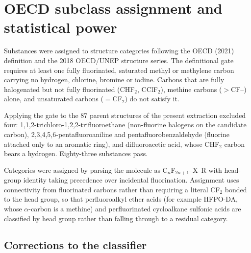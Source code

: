\documentclass[11pt]{article}
\begin{document}
\section{OECD subclass assignment and statistical power}

Substances were assigned to structure categories following the OECD (2021)
definition and the 2018 OECD/UNEP structure series. The definitional gate
requires at least one fully fluorinated, saturated methyl or methylene carbon
carrying no hydrogen, chlorine, bromine or iodine. Carbons that are fully
halogenated but not fully fluorinated (CHF$_2$, CClF$_2$), methine carbons
($>$CF--) alone, and unsaturated carbons ($=$CF$_2$) do not satisfy it.

Applying the gate to the 87 parent structures of the present extraction excluded
four: 1,1,2-tri\-chloro-1,2,2-tri\-fluoro\-ethane (non-fluorine halogens on the
candidate carbon), 2,3,4,5,6-penta\-fluoro\-aniline and penta\-fluoro\-benzaldehyde
(fluorine attached only to an aromatic ring), and di\-fluoro\-acetic acid, whose
CHF$_2$ carbon bears a hydrogen. Eighty-three substances pass.

Categories were assigned by parsing the molecule as C$_n$F$_{2n+1}$--X--R with
head-group identity taking precedence over incidental fluorination. Assignment
uses connectivity from fluorinated carbons rather than requiring a literal
CF$_2$ bonded to the head group, so that perfluoroalkyl ether acids (for example
HFPO-DA, whose $\alpha$-carbon is a methine) and perfluorinated cycloalkane
sulfonic acids are classified by head group rather than falling through to a
residual category.

\subsection*{Corrections to the classifier}
\end{document}
